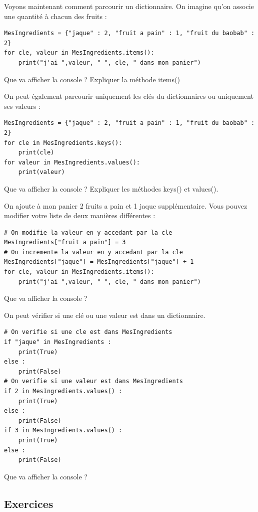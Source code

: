 \vspace{0.3cm}
%
Voyons maintenant comment parcourir un dictionnaire. On imagine qu'on associe une quantité à chacun des fruits :
\begin{lstlisting}
MesIngredients = {"jaque" : 2, "fruit a pain" : 1, "fruit du baobab" : 2}
for cle, valeur in MesIngredients.items():
    print("j'ai ",valeur, " ", cle, " dans mon panier")
\end{lstlisting}
Que va afficher la console ? Expliquer la méthode items()
\vspace{1.7cm}

\noindent On peut également parcourir uniquement les clés du dictionnaires ou uniquement ses valeurs :
\begin{lstlisting}
MesIngredients = {"jaque" : 2, "fruit a pain" : 1, "fruit du baobab" : 2}
for cle in MesIngredients.keys():
    print(cle)
for valeur in MesIngredients.values():
    print(valeur)
\end{lstlisting}
Que va afficher la console ? Expliquer les méthodes keys() et values().
\vspace{1.7cm}

On ajoute à mon panier 2 fruits a pain et 1 jaque supplémentaire. Vous pouvez modifier votre liste de deux manières différentes :
\begin{lstlisting}
# On modifie la valeur en y accedant par la cle
MesIngredients["fruit a pain"] = 3 
# On incremente la valeur en y accedant par la cle
MesIngredients["jaque"] = MesIngredients["jaque"] + 1 
for cle, valeur in MesIngredients.items():
    print("j'ai ",valeur, " ", cle, " dans mon panier")
\end{lstlisting}
Que va afficher la console ?
\vspace{3cm}

On peut vérifier si une clé ou une valeur est dans un dictionnaire.
\begin{lstlisting}
# On verifie si une cle est dans MesIngredients
if "jaque" in MesIngredients :
    print(True)
else :
    print(False)
# On verifie si une valeur est dans MesIngredients
if 2 in MesIngredients.values() :
    print(True)
else :
    print(False)
if 3 in MesIngredients.values() :
    print(True)
else :
    print(False)
\end{lstlisting}
Que va afficher la console ?
\vspace{2cm}


\subsection*{Exercices}

